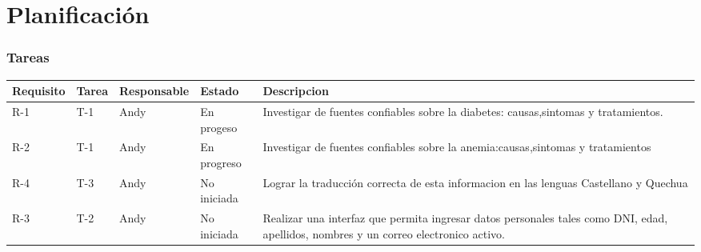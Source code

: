 \chapter{Planificación}

\subsection{Tareas}
\begin{table}[htbp]
	\begin{center}
		\begin{tabular}{| p{1.8cm}| p{1.2cm}| p{2.4cm}|p{2.2cm} |p{7.8cm} |}
	\hline
	\textbf{Requisito} & \textbf{Tarea} & \textbf {Responsable}& \textbf{Estado} & \textbf{Descripcion}
	\\\hline  
	R-1&T-1&Andy&En progeso&Investigar de fuentes confiables sobre la diabetes: causas,sintomas y tratamientos.
	 \\ \hline
	R-2&T-1&Andy&En progreso&Investigar de fuentes confiables sobre la anemia:causas,sintomas y tratamientos
	 \\ \hline
	R-4&T-3&Andy&No iniciada&Lograr la traducción correcta de esta informacion en las lenguas Castellano y Quechua
	 \\ \hline
	R-3&T-2&Andy&No iniciada&Realizar una interfaz que permita ingresar datos personales tales como DNI, edad, apellidos, nombres y un correo electronico activo.
	 \\ \hline
		\end{tabular}
\end{center}
\end{table}

